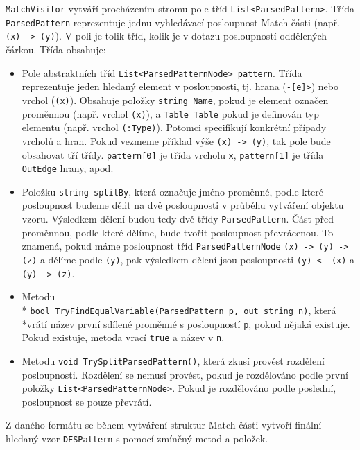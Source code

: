 \texttt{MatchVisitor} vytváří procházením stromu pole tříd \texttt{List<ParsedPattern>}.
Třída \texttt{ParsedPattern} reprezentuje jednu vyhledávací posloupnost Match části (např. \texttt{(x) -> (y)}).
V poli je tolik tříd, kolik je v dotazu posloupností oddělených čárkou.
Třída obsahuje:
\begin{itemize}
\item Pole abstraktních tříd \texttt{List<ParsedPatternNode> pattern}.
Třída reprezentuje jeden hledaný element v posloupnosti, tj. hrana  (\texttt{-[e]>}) nebo vrchol (\texttt{(x)}).
Obsahuje položky \texttt{string Name}, pokud je element označen proměnnou (např. vrchol \texttt{(x)}), a \texttt{Table Table} pokud je definován typ elementu (např. vrchol \texttt{(:Type)}).
Potomci specifikují konkrétní případy vrcholů a hran. Pokud vezmeme příklad výše \texttt{(x) -> (y)}, tak pole bude obsahovat tří třídy.
\texttt{pattern[0]} je třída vrcholu \texttt{x}, \texttt{pattern[1]} je třída \texttt{OutEdge} hrany,  apod.

\item Položku \texttt{string splitBy}, která označuje jméno proměnné, podle které posloupnost budeme dělit na dvě posloupnosti v průběhu vytváření objektu vzoru.
Výsledkem dělení budou tedy dvě třídy \texttt{ParsedPattern}.
Část před proměnnou, podle které dělíme, bude tvořit posloupnost převrácenou.
To znamená, pokud máme posloupnost tříd \texttt{ParsedPatternNode} \texttt{(x) -> (y) -> (z)} a dělíme podle \texttt{(y)}, pak výsledkem dělení jsou posloupnosti 
\texttt{(y) <- (x)} a \texttt{(y) -> (z)}.

\item Metodu\\* \texttt{bool TryFindEqualVariable(ParsedPattern p, out string n)}, která \\*vrátí název první sdílené proměnné s posloupností \texttt{p}, pokud nějaká existuje.
Pokud existuje, metoda vrací \texttt{true} a název v \texttt{n}.

\item Metodu \texttt{void TrySplitParsedPattern()}, která zkusí provést rozdělení posloupnosti.
Rozdělení se nemusí provést, pokud je rozdělováno podle první položky \texttt{List<ParsedPatternNode>}. 
Pokud je rozdělováno podle poslední, posloupnost se pouze převrátí.

\end{itemize}
Z daného formátu se během vytváření struktur Match části vytvoří finální hledaný vzor \texttt{DFSPattern} s pomocí zmíněný metod a položek.

